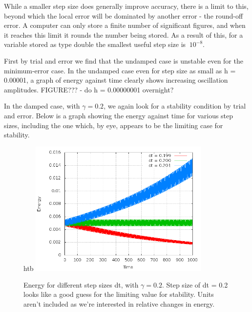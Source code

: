 \documentclass[a4paper,11pt,twoside]{article}
\begin{document}

While a smaller step size does generally improve accuracy, there is 
a limit to this, beyond which the local error will be dominated by 
another error - the round-off error. A computer can only store a 
finite number of significant figures, and when it reaches this limit 
it rounds the number being stored. As a result of this, for a variable 
stored as type double the smallest useful step size is \(~10^{-8}\).

First by trial and error we find that the undamped case is unstable 
even for the minimum-error case.
In the undamped case even for step size as small as h = 0.00001, 
a graph of energy against time clearly shows increasing oscillation 
amplitudes.
FIGURE??? - do h = 0.00000001 overnight?

In the damped case, with \(\gamma = 0.2\), we again look for a 
stability condition by trial and error. Below is a graph showing the 
energy against time for various step sizes, including the one which, by
eye, appears to be the limiting case for stability. 

\begin{figure}{htb}
	\centering
	\includegraphics[width=0.8\textwidth]{euler_energies.png}
	\caption{Energy for different step sizes dt, with \(\gamma = 0.2\). 
		Step size of dt = 0.2 looks like a good guess 
		for the limiting value for stability. Units aren't included 
		as we're interested in relative changes in energy.}
	\label{fig:eulercond}
\end{figure}
\end{document}
